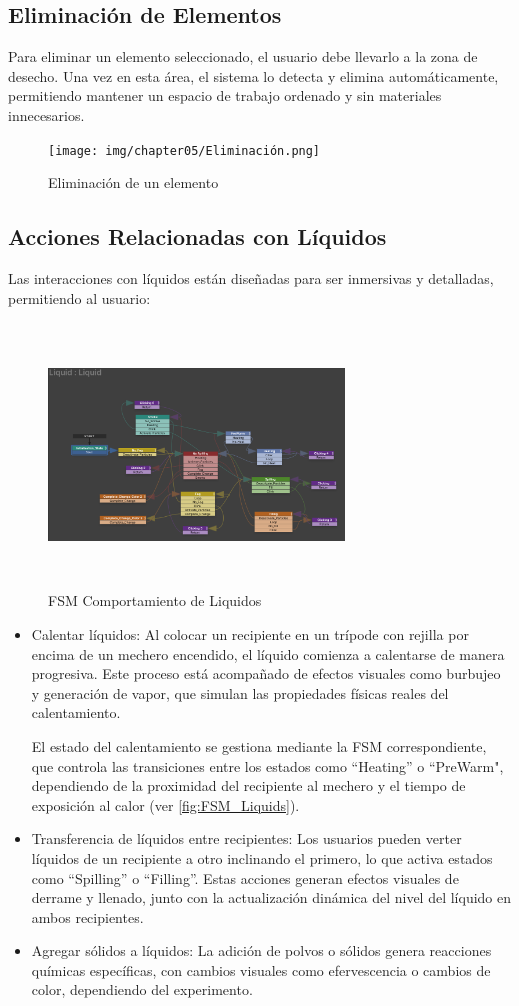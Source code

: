 \subsection{Eliminación de Elementos}
Para eliminar un elemento seleccionado, el usuario debe llevarlo a la zona de desecho. Una vez en esta área, el sistema lo detecta y elimina automáticamente, permitiendo mantener un espacio de trabajo ordenado y sin materiales innecesarios.
\begin{figure}[thbp]
    \centering
    \texttt{[image: img/chapter05/Eliminación.png]}
    \caption{Eliminación de un elemento}
    \label{fig:Eliminación}
\end{figure}
\newpage
\subsection{Acciones Relacionadas con Líquidos}
Las interacciones con líquidos están diseñadas para ser inmersivas y detalladas, permitiendo al usuario:
\begin{figure}[thbp]
    \centering
    \includegraphics[width=0.7\textwidth, height = 7cm]{img/chapter05/Liquids.png}
    \caption{FSM Comportamiento de Liquidos}
    \label{fig:FSM_Liquids}
\end{figure}
\begin{itemize}
    \item Calentar líquidos: Al colocar un recipiente en un trípode con rejilla por encima de un mechero encendido, el líquido comienza a calentarse de manera progresiva. Este proceso está acompañado de efectos visuales como burbujeo y generación de vapor, que simulan las propiedades físicas reales del calentamiento.
    
    El estado del calentamiento se gestiona mediante la FSM correspondiente, que controla las transiciones entre los estados como ``Heating'' o ``PreWarm", dependiendo de la proximidad del recipiente al mechero y el tiempo de exposición al calor (ver \autoref{fig:FSM_Liquids}).
    \item Transferencia de líquidos entre recipientes: Los usuarios pueden verter líquidos de un recipiente a otro inclinando el primero, lo que activa estados como ``Spilling'' o ``Filling''. Estas acciones generan efectos visuales de derrame y llenado, junto con la actualización dinámica del nivel del líquido en ambos recipientes.
    \item Agregar sólidos a líquidos: La adición de polvos o sólidos genera reacciones químicas específicas, con cambios visuales como efervescencia o cambios de color, dependiendo del experimento.
\end{itemize}
